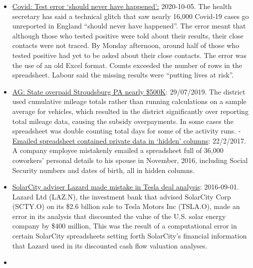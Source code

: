 \documentclass[
]{book}
\begin{document}
\begin{itemize}
\item
  \href{https://www.bbc.com/news/uk-54422505}{Covid: Test error `should never have happened':} 2020-10-05. The health secretary has said a technical glitch that saw nearly 16,000 Covid-19 cases go unreported in England ``should never have happened''. The error meant that although those who tested positive were told about their results, their close contacts were not traced. By Monday afternoon, around half of those who tested positive had yet to be asked about their close contacts. The error was the use of an old Excel format. Counts exceeded the number of rows in the spreadsheet. Labour said the missing results were ``putting lives at risk''.
\item
  \href{https://www.poconorecord.com/news/20190729/ag-state-overpaid-stroudsburg-nearly-500k}{AG: State overpaid Stroudsburg PA nearly \$500K}: 29/07/2019. The district used cumulative mileage totals rather than running calculations on a sample average for vehicles, which resulted in the district significantly over reporting total mileage data, causing the subsidy overpayments. In some cases the spreadsheet was double counting total days for some of the activity runs.
  -\href{https://www.theregister.co.uk}{Emailed spreadsheet contained private data in `hidden' columns}: 22/2/2017. A company employee mistakenly emailed a spreadsheet full of 36,000 coworkers' personal details to his spouse in November, 2016, including Social Security numbers and dates of birth, all in hidden columns.
\item
  \href{http://www.reuters.com/article/us-solarcity-lazard-idUSKCN11635K}{SolarCity adviser Lazard made mistake in Tesla deal analysis}: 2016-09-01. Lazard Ltd (LAZ.N), the investment bank that advised SolarCity Corp (SCTY.O) on its \$2.6 billion sale to Tesla Motors Inc (TSLA.O), made an error in its analysis that discounted the value of the U.S. solar energy company by \$400 million, This was the result of a computational error in certain SolarCity spreadsheets setting forth SolarCity's financial information that Lazard used in its discounted cash flow valuation analyses.
\item

\end{itemize}
\end{document}

